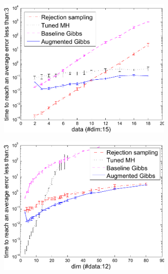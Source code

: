 \begin{figure}[thb!]
\centering
\begin{subfigure}{.42\textwidth}
  \centering
  \includegraphics[width=0.95\textwidth]{plot/bppl_data_analysis_fit.pdf}
  \caption{}
  \label{fig:error-samples-bppl}
\end{subfigure}
\begin{subfigure}{.42\textwidth}
  \centering
  \hspace{5mm} \includegraphics[width=0.95\textwidth]{plot/bppl_dim_analysis_fit.pdf}
  \caption{}
  \label{fig:error-samples-bppl}
\end{subfigure}

\end{figure}
